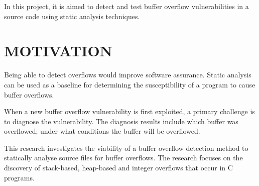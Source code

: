 In this project, it is aimed to detect and test buffer overflow vulnerabilities in a source code using static analysis techniques. \cite{Two}


\section{MOTIVATION}
Being able to detect overflows would improve software assurance. Static analysis can be used as a baseline for determining the susceptibility of a program to cause buffer overflows.  

When a new buffer overflow vulnerability is first exploited, a primary challenge is to diagnose the vulnerability. The diagnosis results include which buffer was overflowed; under what conditions the buffer will be overflowed. 

This research investigates the viability of a buffer overflow detection method to statically analyse source files for buffer overflows. The research focuses on the discovery of stack-based, heap-based and integer overflows that occur in C programs.